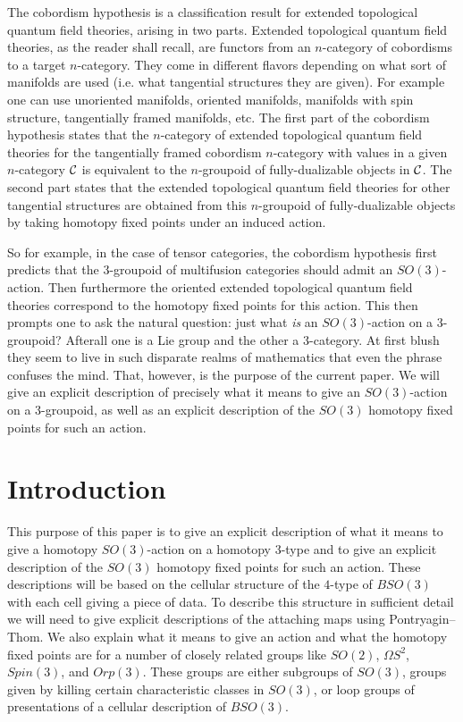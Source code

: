 \documentclass{amsart}
\begin{document}
The cobordism hypothesis is a classification result for extended topological quantum field theories, arising in two parts. Extended topological quantum field theories, as the reader shall recall, are functors from an $n$-category of cobordisms to a target $n$-category. They come in different flavors depending on what sort of manifolds are used (i.e. what tangential structures they are given). For example one can use unoriented manifolds, oriented manifolds, manifolds with spin structure, tangentially framed manifolds, etc. The first part of the cobordism hypothesis states that the $n$-category of extended topological quantum field theories for the tangentially framed cobordism $n$-category with values in a given $n$-category $\mathcal C$ is equivalent to the $n$-groupoid of fully-dualizable objects in $\mathcal C$. The second part states that the  extended topological quantum field theories for other tangential structures are obtained from this $n$-groupoid of fully-dualizable objects by taking homotopy fixed points under an induced action. 

So for example, in the case of tensor categories, the cobordism hypothesis first predicts that the 3-groupoid of multifusion categories should admit an $SO(3)$-action. Then furthermore the oriented extended topological quantum field theories correspond to the homotopy fixed points for this action. This then prompts one to ask the natural question: just what \emph{is} an $SO(3)$-action on a 3-groupoid? Afterall one is a Lie group and the other a 3-category. At first blush they seem to live in such disparate realms of mathematics that even the phrase confuses the mind.
That, however, is the purpose of the current paper. We will give an explicit description of precisely what it means to give an $SO(3)$-action on a 3-groupoid, as well as an explicit description of the $SO(3)$ homotopy fixed points for such an action.




 


\section{Introduction}

This purpose of this paper is to give an explicit description of what it means to give a homotopy $SO(3)$-action on a homotopy 3-type and to give an explicit description of the $SO(3)$ homotopy fixed points for such an action.  These descriptions will be based on the cellular structure of the $4$-type of $BSO(3)$ with each cell giving a piece of data.  To describe this structure in sufficient detail we will need to give explicit descriptions of the attaching maps using Pontryagin--Thom.  We also explain what it means to give an action and what the homotopy fixed points are for a number of closely related groups like $SO(2)$, $\Omega S^2$, $Spin(3)$, and $Orp(3)$.  These groups are either subgroups of $SO(3)$, groups given by killing certain characteristic classes in $SO(3)$, or loop groups of presentations of a cellular description of $BSO(3)$.
\end{document}
